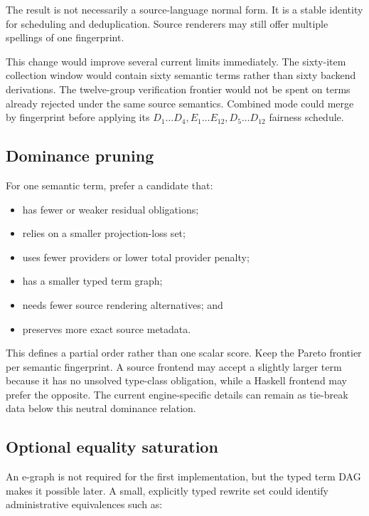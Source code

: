 \documentclass[11pt]{article}
\begin{document}
The result is not necessarily a source-language normal form.  It is a stable
identity for scheduling and deduplication.  Source renderers may still offer
multiple spellings of one fingerprint.

This change would improve several current limits immediately.  The sixty-item
collection window would contain sixty semantic terms rather than sixty backend
derivations.  The twelve-group verification frontier would not be spent on
terms already rejected under the same source semantics.  Combined mode could
merge by fingerprint before applying its \(D_1\ldots D_4, E_1\ldots E_{12},
D_5\ldots D_{12}\) fairness schedule.

\subsection{Dominance pruning}

For one semantic term, prefer a candidate that:

\begin{itemize}
  \item has fewer or weaker residual obligations;
  \item relies on a smaller projection-loss set;
  \item uses fewer providers or lower total provider penalty;
  \item has a smaller typed term graph;
  \item needs fewer source rendering alternatives; and
  \item preserves more exact source metadata.
\end{itemize}

This defines a partial order rather than one scalar score.  Keep the Pareto
frontier per semantic fingerprint.  A source frontend may accept a slightly
larger term because it has no unsolved type-class obligation, while a Haskell
frontend may prefer the opposite.  The current engine-specific details can
remain as tie-break data below this neutral dominance relation.

\subsection{Optional equality saturation}

An e-graph is not required for the first implementation, but the typed term DAG
makes it possible later.  A small, explicitly typed rewrite set could identify
administrative equivalences such as:
\end{document}
